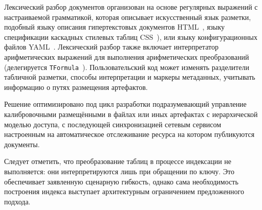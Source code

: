 Лексический разбор документов организован на основе регулярных
выражений с настраиваемой грамматикой, которая описывает
искусственный язык разметки, подобный
языку описания гипертекстовых документов HTML~\cite{berners1989information},
языку спецификации каскадных стилевых таблиц CSS~\cite{lie1996cascading}),
или языку конфигурационных файлов YAML~\cite{yaml-rfc9512}.
Лексический разбор также включает интерпретатор
арифметических выражений для выполнения арифметических
преобразований (делегируется \texttt{TFormula}~\cite{ROOT-framework}).
Пользовательский код
может изменять разделители табличной разметки, способы
интерпретации и маркеры метаданных, учитывать информацию
о путях размещения артефактов.

Решение оптимизировано под цикл разработки подразумевающий
управление калибровочными размещёнными в файлах или иных артефактах
с иерархической моделью доступа, с последующей синхронизацией
сетевым сервисом настроенным на автоматическое
отслеживание ресурса на котором публикуются документы.

Следует отметить, что преобразование таблиц в процессе индексации
не выполняется: они интерпретируются лишь при обращении по ключу.
Это обеспечивает заявленную сценарную гибкость, однако сама необходимость
построения индекса выступает архитектурным ограничением предложенного
подхода.